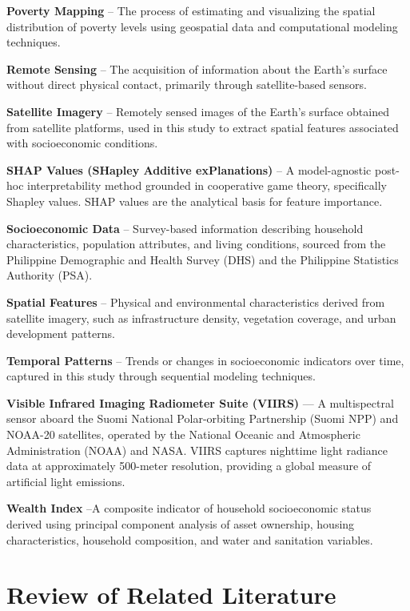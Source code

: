 \documentclass[12pt, letterpaper]{article}
\numberwithin{figure}{section}
\numberwithin{table}{section}
\begin{document}
\textbf{Poverty Mapping} – The process of estimating and visualizing
the spatial distribution of poverty levels using geospatial data and
computational modeling techniques.

\textbf{Remote Sensing} – The acquisition of information about the
Earth's surface without direct physical contact, primarily through
satellite-based sensors.

\textbf{Satellite Imagery} – Remotely sensed images of the Earth's
surface obtained from satellite platforms, used in this study to
extract spatial features associated with socioeconomic conditions.

\textbf{SHAP Values (SHapley Additive exPlanations)} – A
model-agnostic post-hoc interpretability method grounded in
cooperative game theory, specifically Shapley values. SHAP values are
the analytical basis for feature importance.

\textbf{Socioeconomic Data} – Survey-based information describing
household characteristics, population attributes, and living
conditions, sourced from the Philippine Demographic and Health Survey
(DHS) and the Philippine Statistics Authority (PSA).

\textbf{Spatial Features} – Physical and environmental
characteristics derived from satellite imagery, such as
infrastructure density, vegetation coverage, and urban development patterns.

\textbf{Temporal Patterns} – Trends or changes in socioeconomic
indicators over time, captured in this study through sequential
modeling techniques.

\textbf{Visible Infrared Imaging Radiometer Suite (VIIRS)} — A
multispectral sensor aboard the Suomi National Polar-orbiting
Partnership (Suomi NPP) and NOAA-20 satellites, operated by the
National Oceanic and Atmospheric Administration (NOAA) and NASA.
VIIRS captures nighttime light radiance data at approximately
500-meter resolution, providing a global measure of artificial light emissions.

\textbf{Wealth Index} –A composite indicator of household
socioeconomic status derived using principal component analysis
of asset ownership, housing characteristics, household composition,
and water and sanitation variables.

\section{Review of Related Literature}
\end{document}
